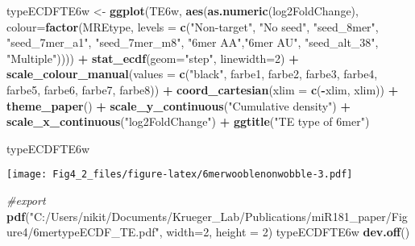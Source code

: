 \documentclass[
]{article}
\newenvironment{Shaded}{\begin{snugshade}}{\end{snugshade}}
\newcommand{\AttributeTok}[1]{\textcolor[rgb]{0.13,0.29,0.53}{#1}}
\newcommand{\CommentTok}[1]{\textcolor[rgb]{0.56,0.35,0.01}{\textit{#1}}}
\newcommand{\DecValTok}[1]{\textcolor[rgb]{0.00,0.00,0.81}{#1}}
\newcommand{\FunctionTok}[1]{\textcolor[rgb]{0.13,0.29,0.53}{\textbf{#1}}}
\newcommand{\NormalTok}[1]{#1}
\newcommand{\OtherTok}[1]{\textcolor[rgb]{0.56,0.35,0.01}{#1}}
\newcommand{\SpecialCharTok}[1]{\textcolor[rgb]{0.81,0.36,0.00}{\textbf{#1}}}
\newcommand{\StringTok}[1]{\textcolor[rgb]{0.31,0.60,0.02}{#1}}
\begin{document}
\begin{Shaded}
\begin{Highlighting}[]
\NormalTok{typeECDFTE6w }\OtherTok{\textless{}{-}} \FunctionTok{ggplot}\NormalTok{(TE6w, }\FunctionTok{aes}\NormalTok{(}\FunctionTok{as.numeric}\NormalTok{(log2FoldChange), }
                              \AttributeTok{colour=}\FunctionTok{factor}\NormalTok{(MREtype, }\AttributeTok{levels =} \FunctionTok{c}\NormalTok{(}\StringTok{"Non{-}target"}\NormalTok{, }\StringTok{"No seed"}\NormalTok{, }\StringTok{"seed\_8mer"}\NormalTok{, }\StringTok{"seed\_7mer\_a1"}\NormalTok{, }\StringTok{"seed\_7mer\_m8"}\NormalTok{, }\StringTok{"6mer AA"}\NormalTok{,}\StringTok{"6mer AU"}\NormalTok{, }\StringTok{"seed\_alt\_38"}\NormalTok{, }\StringTok{"Multiple"}\NormalTok{)))) }\SpecialCharTok{+} 
  \FunctionTok{stat\_ecdf}\NormalTok{(}\AttributeTok{geom=}\StringTok{"step"}\NormalTok{, }\AttributeTok{linewidth=}\DecValTok{2}\NormalTok{) }\SpecialCharTok{+}
  \FunctionTok{scale\_colour\_manual}\NormalTok{(}\AttributeTok{values =} \FunctionTok{c}\NormalTok{(}\StringTok{"black"}\NormalTok{, farbe1, farbe2, farbe3, farbe4, farbe5, farbe6, farbe7, farbe8)) }\SpecialCharTok{+}
  \FunctionTok{coord\_cartesian}\NormalTok{(}\AttributeTok{xlim =} \FunctionTok{c}\NormalTok{(}\SpecialCharTok{{-}}\NormalTok{xlim, xlim)) }\SpecialCharTok{+} 
  \FunctionTok{theme\_paper}\NormalTok{() }\SpecialCharTok{+}
  \FunctionTok{scale\_y\_continuous}\NormalTok{(}\StringTok{"Cumulative density"}\NormalTok{) }\SpecialCharTok{+} \FunctionTok{scale\_x\_continuous}\NormalTok{(}\StringTok{"log2FoldChange"}\NormalTok{) }\SpecialCharTok{+}
  \FunctionTok{ggtitle}\NormalTok{(}\StringTok{"TE type of 6mer"}\NormalTok{)}

\NormalTok{typeECDFTE6w}
\end{Highlighting}
\end{Shaded}

\texttt{[image: Fig4\_2\_files/figure-latex/6merwooblenonwobble-3.pdf]}

\begin{Shaded}
\begin{Highlighting}[]
\CommentTok{\#export}
\FunctionTok{pdf}\NormalTok{(}\StringTok{"C:/Users/nikit/Documents/Krueger\_Lab/Publications/miR181\_paper/Figure4/6mertypeECDF\_TE.pdf"}\NormalTok{, }\AttributeTok{width=}\DecValTok{2}\NormalTok{, }\AttributeTok{height =} \DecValTok{2}\NormalTok{)}
\NormalTok{typeECDFTE6w}
\FunctionTok{dev.off}\NormalTok{()}
\end{Highlighting}
\end{Shaded}
\end{document}
